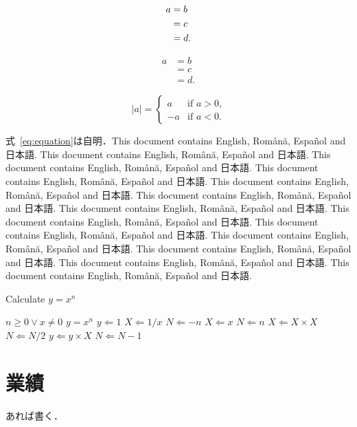 \documentclass[
	10pt,
	a4j,		%
	twocolumn,	%
	uplatex
]{jsarticle}
\begin{document}
\begin{align}
a &= b	\\
&= c	\notag\\
&= d.
\end{align}

\begin{equation}
\begin{aligned}
a &= b	\\
&= c	\\
&= d.
\end{aligned}
\label{eq:equation}
\end{equation}

\begin{equation}
|a| =
\begin{cases}
a  & \text{if $a>0$,}\\
-a & \text{if $a<0$.}
\end{cases}
\end{equation}

式~\eqref{eq:equation}は自明．This document contains English, Română, Español and 日本語. This document contains English, Română, Español and 日本語. This document contains English, Română, Español and 日本語. This document contains English, Română, Español and 日本語. This document contains English, Română, Español and 日本語. This document contains English, Română, Español and 日本語. This document contains English, Română, Español and 日本語. This document contains English, Română, Español and 日本語. This document contains English, Română, Español and 日本語. This document contains English, Română, Español and 日本語. This document contains English, Română, Español and 日本語. This document contains English, Română, Español and 日本語. This document contains English, Română, Español and 日本語. 

\begin{algorithm}[t]
	\caption{Calculate $y = x^n$}
	\label{alg:algorithm}
	\begin{algorithmic}[1]
		\Require	$n \geq 0 \vee x \neq 0$
		\Ensure	$y = x^n$
		\State $y \Leftarrow 1$
				\State $X \Leftarrow 1 / x$
				\State $N \Leftarrow -n$
			\Else
				\State $X \Leftarrow x$
				\State $N \Leftarrow n$
			\EndIf
				\State $X \Leftarrow X \times X$
				\State $N \Leftarrow N / 2$
			\Else[$N$ is odd]
				\State $y \Leftarrow y \times X$
				\State $N \Leftarrow N - 1$
			\EndIf
		\EndWhile
	\end{algorithmic}
\end{algorithm}


{\footnotesize
	
}

\section*{業績}
あれば書く．
\end{document}
